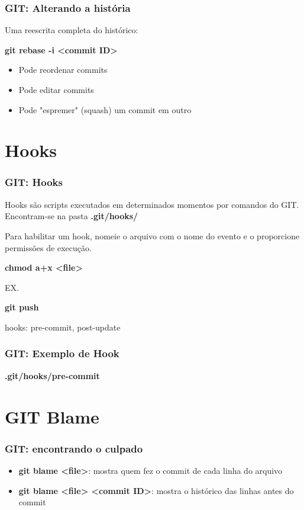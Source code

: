 \documentclass{beamer}
\begin{document}
\begin{frame}
\frametitle{GIT: Alterando a história}

Uma reescrita completa do histórico:

\textbf{git rebase -i <commit ID>}

\begin{itemize}
\item Pode reordenar commits
\item Pode editar commits
\item Pode "espremer" (squash) um commit em outro
\end{itemize}


\end{frame}

\section{Hooks}
\begin{frame}
\frametitle{GIT: Hooks}

Hooks são scripts executados em determinados momentos por comandos do GIT. Encontram-se na pasta \textbf{.git/hooks/}

Para habilitar um hook, nomeie o arquivo com o nome do evento e o proporcione permissões de execução.

\textbf{chmod a+x <file>}

EX.

\textbf{git push}

hooks: pre-commit, post-update
\end{frame}

\begin{frame}
\frametitle{GIT: Exemplo de Hook}

\textbf{.git/hooks/pre-commit}

\end{frame}

\section{GIT Blame}
\begin{frame}
\frametitle{GIT: encontrando o culpado}


\begin{itemize}
\item \textbf{git blame <file>}: mostra quem fez o commit de cada linha do arquivo
\item \textbf{git blame <file> <commit ID>}: mostra o histórico das linhas antes do commit
\end{itemize}


\end{frame}
\end{document}
